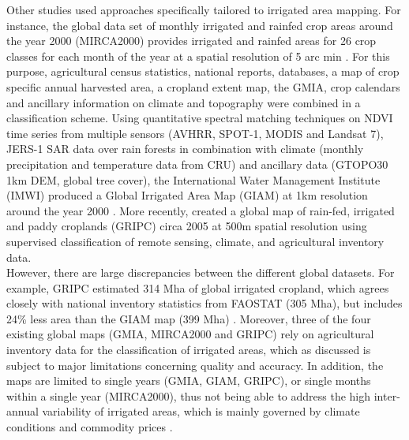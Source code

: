 \documentclass[hess, manuscript]{copernicus}
\begin{document}
Other studies used approaches specifically tailored to irrigated area mapping. For instance, the global data set of monthly irrigated and rainfed crop areas around the year 2000 (MIRCA2000) provides irrigated and rainfed areas for 26 crop classes for each month of the year at a spatial resolution of 5 arc min \citep{portmann2010mirca2000}. For this purpose, agricultural census statistics, national reports, databases, a map of crop specific annual harvested area, a cropland extent map, the GMIA, crop calendars and ancillary information on climate and topography were combined in a classification scheme.
Using quantitative spectral matching techniques on NDVI time series from multiple sensors (AVHRR, SPOT-1, MODIS and Landsat 7), JERS-1 SAR data over rain forests in combination with climate (monthly precipitation and temperature data from CRU) and ancillary data (GTOPO30 1km DEM, global tree cover), the International Water Management Institute (IMWI) produced a Global Irrigated Area Map (GIAM) at 1km resolution around the year 2000 \citep{Thenkabail2009}. 
More recently, \citet{Salmon2015} created a global map of rain-fed, irrigated and paddy croplands (GRIPC) circa 2005 at 500m spatial resolution using supervised classification of remote sensing, climate, and agricultural inventory data.\\
However, there are large discrepancies between the different global datasets. For example, GRIPC estimated 314 Mha of global irrigated cropland, which agrees closely with national inventory statistics from FAOSTAT (305 Mha), but includes 24\% less area than the GIAM map (399 Mha) \citep{Salmon2015}. Moreover, three of the four existing global maps (GMIA, MIRCA2000 and GRIPC) rely on agricultural inventory data for the classification of irrigated areas, which as discussed is subject to major limitations concerning quality and accuracy. In addition, the maps are limited to single years (GMIA, GIAM, GRIPC), or single months within a single year (MIRCA2000), thus not being able to address the high inter-annual variability of irrigated areas, which is mainly governed by climate conditions and commodity prices \citep{Deines2017}.\\
\end{document}
